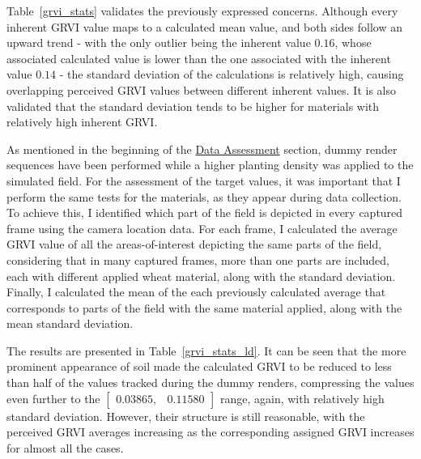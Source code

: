 Table~\ref{grvi_stats} validates the previously expressed concerns. Although every inherent GRVI value maps to a calculated mean value, and both sides follow an upward trend - with the only outlier being the inherent value $0.16$, whose associated calculated value is lower than the one associated with the inherent value $0.14$ - the standard deviation of the calculations is relatively high, causing overlapping perceived GRVI values between different inherent values. It is also validated that the standard deviation tends to be higher for materials with relatively high inherent GRVI. 

As mentioned in the beginning of the \hyperref[datasssessment]{Data Assessment} section, dummy render sequences have been performed while a higher planting density was applied to the simulated field. For the assessment of the target values, it was important that I perform the same tests for the materials, as they appear during data collection. To achieve this, I identified which part of the field is depicted in every captured frame using the camera location data. For each frame, I calculated the average GRVI value of all the areas-of-interest depicting the same parts of the field, considering that in many captured frames, more than one parts are included, each with different applied wheat material, along with the standard deviation. Finally, I calculated the mean of the each previously calculated average that corresponds to parts of the field with the same material applied, along with the mean standard deviation.

The results are presented in Table~\ref{grvi_stats_ld}. It can be seen that the more prominent appearance of soil made the calculated GRVI to be reduced to less than half of the values tracked during the dummy renders, compressing the values even further to the $\begin{bmatrix}0.03865, & 0.11580\end{bmatrix}$ range, again, with relatively high standard deviation. However, their structure is still reasonable, with the perceived GRVI averages increasing as the corresponding assigned GRVI increases for almost all the cases.  

